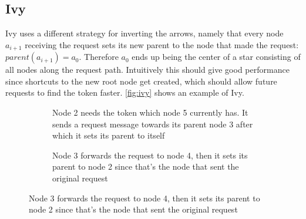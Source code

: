\documentclass[a4paper, oneside]{discothesis}
\begin{document}
\subsection{Ivy}
\label{intro:ivy}

Ivy uses a different strategy for inverting the arrows, namely that every node $a_{i+1}$ receiving the request sets its new parent to the node that made the request: $parent(a_{i+1})=a_{0}$. Therefore $a_{0}$ ends up being the center of a star consisting of all nodes along the request path. Intuitively this should give good performance since shortcuts to the new root node get created, which should allow future requests to find the token faster. \autoref{fig:ivy} shows an example of Ivy.

\begin{figure}[H]
\begin{subfigure}[t]{0.5\textwidth}
\centering
{}
\caption{Node 2 needs the token which node 5 currently has. It sends a request message towards its parent node 3 after which it sets its parent to itself}
\end{subfigure}
\quad
\begin{subfigure}[t]{0.5\textwidth}
\centering
{}
\caption{Node 3 forwards the request to node 4, then it sets its parent to node 2 since that's the node that sent the original request}
\end{subfigure}


\end{figure}
\end{document}
